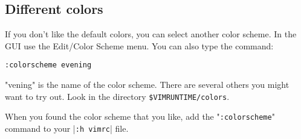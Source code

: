 \subsection{Different colors}
\label{syn-default-override}

If you don't like the default colors, you can select another color scheme.
In the GUI use the Edit/Color Scheme menu.
You can also type the command:

 \begin{Verbatim}[samepage=true]
 :colorscheme evening
 \end{Verbatim}

"vening" is the name of the color scheme.
There are several others you might want to try out.
Look in the directory \verb!$VIMRUNTIME/colors!.

When you found the color scheme that you like, add the "\verb!:colorscheme!" command to your |\verb!:h vimrc!| file.

